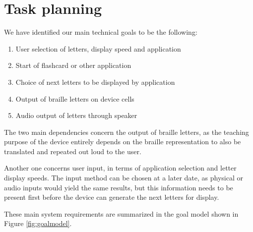 \documentclass{article}
\begin{document}
\section{Task planning}

We have identified our main technical goals to be the following: 
\begin{enumerate}
  \item User selection of letters, display speed and application
  \item Start of flashcard or other application
  \item Choice of next letters to be displayed by application 
  \item Output of braille letters on device cells 
  \item Audio output of letters through speaker
\end{enumerate}

The two main dependencies concern the output of braille letters, as the teaching purpose of the device entirely depends on the braille representation to also be translated and repeated out loud to the user. 
 
Another one concerns user input, in terms of application selection and letter display speeds. The input method can be chosen at a later date, as physical or audio inputs would yield the same results, but this information needs to be present first before the device can generate the next letters for display. 
 
These main system requirements are summarized in the goal model shown in Figure \ref{fig:goalmodel}.
\end{document}

